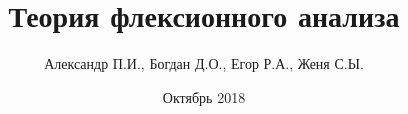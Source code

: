 \documentclass[a4paper,12pt]{book}
\begin{document}
\author{Александр П.И., Богдан Д.О., Егор Р.А., Женя С.Ы.}
\title{Теория флексионного анализа}
\date{Октябрь 2018}

\frontmatter
\maketitle
\tableofcontents

\mainmatter




\backmatter
\end{document}
